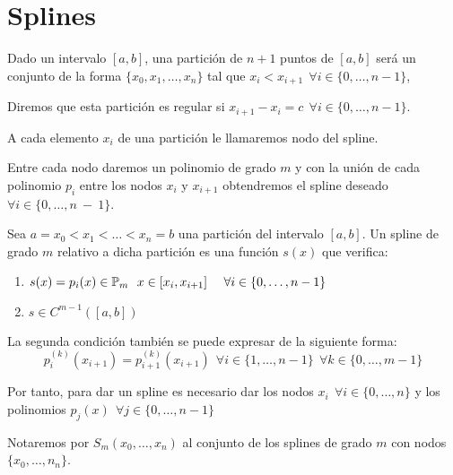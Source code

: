 \chapter{Splines}
\begin{definicion}
    Dado un intervalo $[a, b]$, una partición de $n+1$ puntos de $[a, b]$ será un conjunto
    de la forma $\{x_0, x_1, \ldots, x_n\}$ tal que $x_i < x_{i+1}~~\forall i \in \{0, \ldots, n-1\}$,

    Diremos que esta partición es regular si $x_{i+1} - x_i = c~~\forall i \in \{0, \ldots, n-1\}$.

    A cada elemento $x_i$ de una partición le llamaremos nodo del spline.
\end{definicion}

Entre cada nodo daremos un polinomio de grado $m$ y con la unión de cada polinomio $p_i$ entre los nodos
$x_i$ y $x_{i+1}$ obtendremos el spline deseado $\forall i \in \{0, \ldots, n~-~1\}$.

\bigskip
\begin{definicion}[Spline]
    Sea $a=x_0<x_1 < \ldots < x_n = b$ una partición del intervalo $[a,b]$. Un spline de grado
    $m$ relativo a dicha partición es una función $s(x)$ que verifica:
    \begin{enumerate}
        \item $s(x) = p_i(x) \in \mathbb{P}_m~~x \in [x_i, x_{i+1}]~~~~\forall i \in \{0, \ldots, n-1\}$

        \item $s\in C^{m-1}([a,b])$
    \end{enumerate}

    La segunda condición también se puede expresar de la siguiente forma:
    \begin{equation*}
        p_i^{(k)}(x_{i+1}) = p_{i+1}^{(k)}(x_{i+1})~~\forall i \in \{1, \ldots, n-1\}~~\forall k \in
        \{0, \ldots, m-1\}
    \end{equation*}
\end{definicion}

\noindent
Por tanto, para dar un spline es necesario dar los nodos $x_i~~\forall i \in \{0, \ldots, n\}$ y
los polinomios $p_j(x)~~\forall j \in \{0, \ldots, n-1\}$

\begin{notacion}
    Notaremos por $S_m(x_0, \ldots, x_n)$ al conjunto de los splines de grado $m$ con nodos $\{x_0,
    \ldots, n_n\}$.
\end{notacion}

